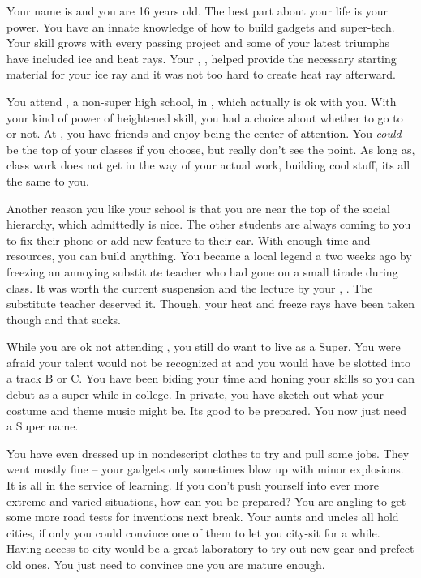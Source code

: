 \documentclass[char]{LRSguildcamp1}
\begin{document}
\name{\cTeen{}}



Your name is \cTeen{\intro} and you are 16 years old. The best part about your life is your power. You have an innate knowledge of how to build gadgets and super-tech. Your skill grows with every passing project and some of your latest triumphs have included ice and heat rays. Your \cOldest{\uncle}, \cOldest{}, helped provide the necessary starting material for your ice ray and it was not too hard to create heat ray afterward. 

You attend \pNormalSchool{}, a non-super high school, in \pCityArchitect{}, which actually is ok with you. With your kind of power of heightened skill, you had a choice about whether to go to \pSuperSchool{} or not. At \pNormalSchool{}, you have friends and enjoy being the center of attention. You \textsl{could} be the top of your classes if you choose, but really don't see the point. As long as,  class work does not get in the way of your actual work, building cool stuff, its all the same to you. 

Another reason you like your school is that you are near the top of the social hierarchy, which admittedly is nice. The other students are always coming to you to fix their phone or add new feature to their car. With enough time and resources, you can build anything. You became a local legend a two weeks ago by freezing an annoying substitute teacher who had gone on a small tirade during class. It was worth the current suspension and the lecture by your \cArchitect{\parent}, \cArchitect{}. The substitute teacher deserved it. Though, your heat and freeze rays have been taken though and that sucks. 

While you are ok not attending \pSuperSchool{}, you still do want to live as a Super. You were afraid your talent would not be recognized at \pSuperSchool{} and you would have be slotted into a track B or C. You have been biding your time and honing your skills so you can debut as a super while in college. In private, you have sketch out what your costume and theme music might be. Its good to be prepared. You now just need a Super name.

You have even dressed up in nondescript clothes to try and pull some jobs. They went mostly fine -- your gadgets only sometimes blow up with minor explosions. It is all in the service of learning. If you don't push yourself into ever more extreme and varied situations, how can you be prepared? You are angling to get some more road tests for inventions next break. Your aunts and uncles all hold cities, if only you could convince one of them to let you city-sit for a while. Having access to city would be a great laboratory to try out new gear and prefect old ones. You just need to convince one you are mature enough.
\end{document}
